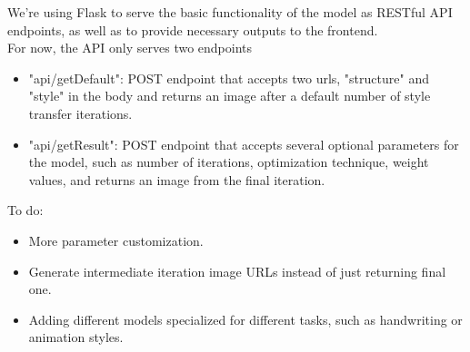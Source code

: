 We're using Flask to serve the basic functionality of the model as RESTful API endpoints, as well as to provide necessary outputs to the frontend.\\
For now, the API only serves two endpoints
\begin{itemize}
    \item "api/getDefault": POST endpoint that accepts two urls, "structure" and "style" in the body and returns an image after a default number of style transfer iterations.
    \item "api/getResult": POST endpoint that accepts several optional parameters for the model, such as number of iterations, optimization technique, weight values, and returns an image from the final iteration.
\end{itemize}

To do:
\begin{itemize}
    \item More parameter customization.
    \item Generate intermediate iteration image URLs instead of just returning final one.
    \item Adding different models specialized for different tasks, such as handwriting or animation styles.
\end{itemize}